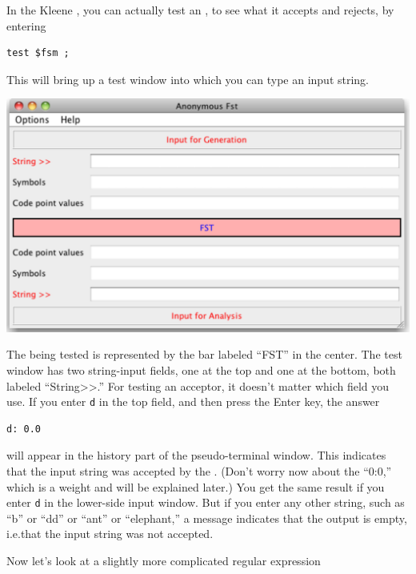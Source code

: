 In the Kleene , you can actually test an \fsm{}, to see what it accepts and rejects, by entering

\begin{Verbatim}
test $fsm ;
\end{Verbatim}

\noindent
This will bring up a test window into which you can type an input string.


\begin{center}
\includegraphics[width=135mm]{images/testWindow.pdf}
\end{center}

\noindent
The \fst{} being tested
is represented by the bar labeled ``FST'' in the center.
The test window has two string-input fields, one at the top and one at the bottom, both labeled
``String>>.''  For testing
an acceptor, it doesn't matter which field you use.  If you enter \texttt{d} in the top 
field, and then press the Enter key, the answer 


\begin{Verbatim}
d: 0.0
\end{Verbatim}

\noindent
will appear in the history part
of the pseudo-terminal window.  This indicates that the input string was accepted
by the \fsm{}.  (Don't worry now
about the ``0:0,'' which is a weight and will be explained later.)
You get the same result if you enter \texttt{d} in the
lower-side input window.  But if you enter any other string, such as ``b'' or
``dd'' or ``ant'' or ``elephant,'' a message
indicates that the output is empty, i.e.\@ that the input string was not
accepted.

Now let's look at a slightly more complicated regular expression

